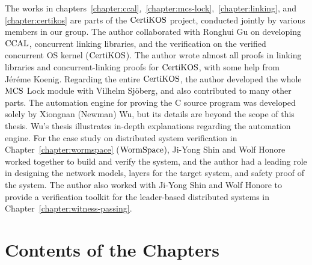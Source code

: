 The works in chapters~\ref{chapter:ccal},~\ref{chapter:mcs-lock},~\ref{chapter:linking}, and \ref{chapter:certikos}  are parts of the $\mathrm{CertiKOS}$ project,
conducted jointly by various members in our group. 
The author collaborated with Ronghui Gu on developing  $\mathrm{CCAL}$, concurrent linking libraries, and the verification on the verified concurrent OS kernel ($\mathrm{CertiKOS}$). 
The author wrote almost all proofs in linking libraries and concurrent-linking proofs for $\mathrm{CertiKOS}$, with some help from J{\'e}r{\'e}me Koenig. 
Regarding the entire $\mathrm{CertiKOS}$, the author developed the whole $\mathrm{MCS}$ Lock module with Vilhelm Sj{\"o}berg, 
and also contributed to many other parts. 
The automation engine for proving the C source program was developed solely by Xiongnan (Newman) Wu, but its details are beyond the scope of this thesis. 
Wu’s thesis illustrates in-depth explanations regarding the automation engine. 
For the case study on distributed system verification in Chapter~\ref{chapter:wormspace} ($\mathrm{WormSpace}$), Ji-Yong Shin and Wolf Honore worked together to build and verify the system, 
and the author had a leading role in designing the network models, layers for the target system, and safety proof of the system. 
The author also worked with Ji-Yong Shin and Wolf Honore to provide a verification toolkit for the leader-based distributed systems in  Chapter~\ref{chapter:witness-passing}.


\section{Contents of the Chapters}
\label{chapter:introduction:sec:contents-of-the-chapters}

